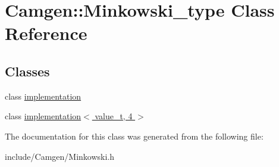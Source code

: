 \hypertarget{a00369}{\section{Camgen\-:\-:Minkowski\-\_\-type Class Reference}
\label{a00369}
}
\subsection*{Classes}
\begin{DoxyCompactItemize}
\item 
class \hyperlink{a00292}{implementation}
\item 
class \hyperlink{a00296}{implementation$<$ value\-\_\-t, 4 $>$}
\end{DoxyCompactItemize}


The documentation for this class was generated from the following file\-:\begin{DoxyCompactItemize}
\item 
include/\-Camgen/Minkowski.\-h\end{DoxyCompactItemize}
